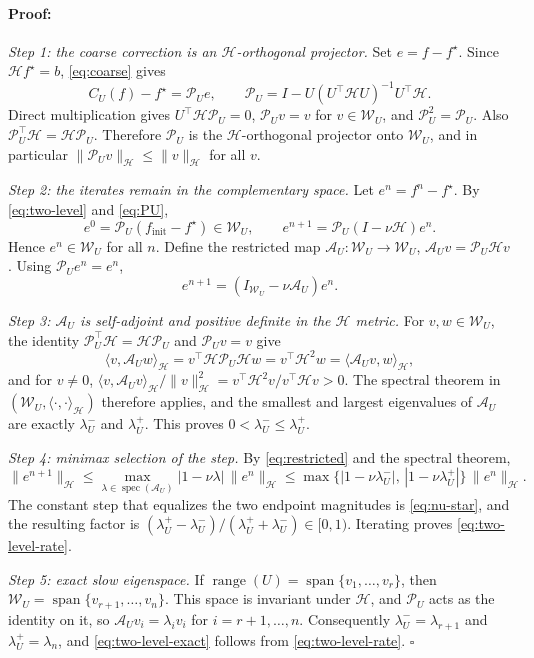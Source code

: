 \documentclass{article}
\newenvironment{proof}{\paragraph{Proof:}}{\hfill$\square$}
\begin{document}
\begin{proof}
\emph{Step 1: the coarse correction is an $\mathcal H$-orthogonal projector.} Set $e=f-f^\star$. Since $\mathcal Hf^\star=b$, \eqref{eq:coarse} gives
\begin{equation}
\label{eq:PU}
C_U(f)-f^\star=\mathcal P_Ue,
\qquad
\mathcal P_U=I-U(U^\top\mathcal HU)^{-1}U^\top\mathcal H.
\end{equation}
Direct multiplication gives $U^\top\mathcal H\mathcal P_U=0$, $\mathcal P_Uv=v$ for $v\in\mathcal W_U$, and $\mathcal P_U^2=\mathcal P_U$. Also $\mathcal P_U^\top\mathcal H=\mathcal H\mathcal P_U$. Therefore $\mathcal P_U$ is the $\mathcal H$-orthogonal projector onto $\mathcal W_U$, and in particular $\|\mathcal P_Uv\|_{\mathcal H}\le\|v\|_{\mathcal H}$ for all $v$.

\emph{Step 2: the iterates remain in the complementary space.} Let $e^n=f^n-f^\star$. By \eqref{eq:two-level} and \eqref{eq:PU},
\[
e^0=\mathcal P_U(f_{\mathrm{init}}-f^\star)\in\mathcal W_U,
\qquad
e^{n+1}=\mathcal P_U(I-\nu\mathcal H)e^n .
\]
Hence $e^n\in\mathcal W_U$ for all $n$. Define the restricted map $\mathcal A_U:\mathcal W_U\to\mathcal W_U$, $\mathcal A_Uv=\mathcal P_U\mathcal Hv$. Using $\mathcal P_Ue^n=e^n$,
\begin{equation}
\label{eq:restricted}
e^{n+1}=(I_{\mathcal W_U}-\nu\mathcal A_U)e^n .
\end{equation}

\emph{Step 3: $\mathcal A_U$ is self-adjoint and positive definite in the $\mathcal H$ metric.} For $v,w\in\mathcal W_U$, the identity $\mathcal P_U^\top\mathcal H=\mathcal H\mathcal P_U$ and $\mathcal P_Uv=v$ give
\[
\langle v,\mathcal A_Uw\rangle_{\mathcal H}=v^\top\mathcal H\mathcal P_U\mathcal Hw=v^\top\mathcal H^2w=\langle\mathcal A_Uv,w\rangle_{\mathcal H},
\]
and for $v\neq0$, $\langle v,\mathcal A_Uv\rangle_{\mathcal H}/\|v\|_{\mathcal H}^2=v^\top\mathcal H^2v/v^\top\mathcal Hv>0$. The spectral theorem in $(\mathcal W_U,\langle\cdot,\cdot\rangle_{\mathcal H})$ therefore applies, and the smallest and largest eigenvalues of $\mathcal A_U$ are exactly $\lambda_U^-$ and $\lambda_U^+$. This proves $0<\lambda_U^-\le\lambda_U^+$.

\emph{Step 4: minimax selection of the step.} By \eqref{eq:restricted} and the spectral theorem,
\[
\|e^{n+1}\|_{\mathcal H}\le\max_{\lambda\in\operatorname{spec}(\mathcal A_U)}|1-\nu\lambda|\,\|e^n\|_{\mathcal H}\le\max\{|1-\nu\lambda_U^-|,\,|1-\nu\lambda_U^+|\}\,\|e^n\|_{\mathcal H}.
\]
The constant step that equalizes the two endpoint magnitudes is \eqref{eq:nu-star}, and the resulting factor is $(\lambda_U^+-\lambda_U^-)/(\lambda_U^++\lambda_U^-)\in[0,1)$. Iterating proves \eqref{eq:two-level-rate}.

\emph{Step 5: exact slow eigenspace.} If $\operatorname{range}(U)=\operatorname{span}\{v_1,\dots,v_r\}$, then $\mathcal W_U=\operatorname{span}\{v_{r+1},\dots,v_n\}$. This space is invariant under $\mathcal H$, and $\mathcal P_U$ acts as the identity on it, so $\mathcal A_Uv_i=\lambda_iv_i$ for $i=r+1,\dots,n$. Consequently $\lambda_U^-=\lambda_{r+1}$ and $\lambda_U^+=\lambda_n$, and \eqref{eq:two-level-exact} follows from \eqref{eq:two-level-rate}.
\end{proof}
\end{document}
